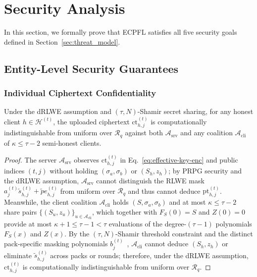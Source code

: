 \section{Security Analysis}
\label{sec:security}

In this section, we formally prove that \textsc{ECPFL} satisfies all five security goals defined in Section~\ref{sec:threat_model}.

\subsection{Entity-Level Security Guarantees}

\subsubsection{Individual Ciphertext Confidentiality}
\begin{theorem}
\label{thm:cpa}
Under the dRLWE assumption and $(\tau, N)$-Shamir secret sharing, for any honest client $h \in \mathcal{H}^{(t)}$, the uploaded ciphertext $\mathrm{ct}_{h,j}^{(t)}$ is computationally indistinguishable from uniform over $\mathcal{R}_q$ against both $\mathcal{A}_{\mathrm{srv}}$ and any coalition $\mathcal{A}_{\mathrm{cli}}$ of $\kappa \le \tau - 2$ semi-honest clients.
\end{theorem}
\begin{proof}
The server $\mathcal{A}_{\mathrm{srv}}$ observes $\mathrm{ct}_{h,j}^{(t)}$ in Eq.~\eqref{eq:effective-key-enc} and public indices $(t,j)$ without holding $(\sigma_a, \sigma_b)$ or $(S_h, z_h)$; by PRPG security and the dRLWE assumption, $\mathcal{A}_{\mathrm{srv}}$ cannot distinguish the RLWE mask $a_j^{(t)}\tilde{s}_{h,j}^{(t)} + \tilde{p}e_{h,j}^{(t)}$ from uniform over $\mathcal{R}_q$ and thus cannot deduce $\mathrm{pt}_{h,j}^{(t)}$. Meanwhile, the client coalition $\mathcal{A}_{\mathrm{cli}}$ holds $(S, \sigma_a, \sigma_b)$ and at most $\kappa \le \tau - 2$ share pairs $\{(S_u, z_u)\}_{u \in \mathcal{A}_{\mathrm{cli}}}$, which together with $F_S(0)=S$ and $Z(0)=0$ provide at most $\kappa + 1 \le \tau - 1 < \tau$ evaluations of the degree-$(\tau-1)$ polynomials $F_S(x)$ and $Z(x)$. By the $(\tau, N)$-Shamir threshold constraint and the distinct pack-specific masking polynomials $b_j^{(t)}$~\cite{colin2026tfhesd}, $\mathcal{A}_{\mathrm{cli}}$ cannot deduce $(S_h, z_h)$ or eliminate $\tilde{s}_{h,j}^{(t)}$ across packs or rounds; therefore, under the dRLWE assumption, $\mathrm{ct}_{h,j}^{(t)}$ is computationally indistinguishable from uniform over $\mathcal{R}_q$.
\end{proof}


